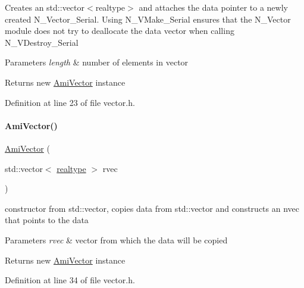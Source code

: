 Creates an std\+::vector$<$realtype$>$ and attaches the data pointer to a newly created N\+\_\+\+Vector\+\_\+\+Serial. Using N\+\_\+\+V\+Make\+\_\+\+Serial ensures that the N\+\_\+\+Vector module does not try to deallocate the data vector when calling N\+\_\+\+V\+Destroy\+\_\+\+Serial 
\begin{DoxyParams}{Parameters}
{\em length} & number of elements in vector \\
\hline
\end{DoxyParams}
\begin{DoxyReturn}{Returns}
new \mbox{\hyperlink{classamici_1_1_ami_vector}{Ami\+Vector}} instance 
\end{DoxyReturn}


Definition at line 23 of file vector.\+h.

\mbox{\label{classamici_1_1_ami_vector_a8ef9433b11b0d14c32e2e4ce18fe055e}} 
\paragraph{\texorpdfstring{Ami\+Vector()}{AmiVector()}\hspace{0.1cm}{\footnotesize\ttfamily [2/3]}}
{\footnotesize\ttfamily \mbox{\hyperlink{classamici_1_1_ami_vector}{Ami\+Vector}} (\begin{DoxyParamCaption}\item[{std\+::vector$<$ \mbox{\hyperlink{namespaceamici_a1bdce28051d6a53868f7ccbf5f2c14a3}{realtype}} $>$}]{rvec }\end{DoxyParamCaption})}

constructor from std\+::vector, copies data from std\+::vector and constructs an nvec that points to the data 
\begin{DoxyParams}{Parameters}
{\em rvec} & vector from which the data will be copied \\
\hline
\end{DoxyParams}
\begin{DoxyReturn}{Returns}
new \mbox{\hyperlink{classamici_1_1_ami_vector}{Ami\+Vector}} instance 
\end{DoxyReturn}


Definition at line 34 of file vector.\+h.

\mbox{\label{classamici_1_1_ami_vector_a3202c4cf34466ec28baece9cf1eae880}} 
